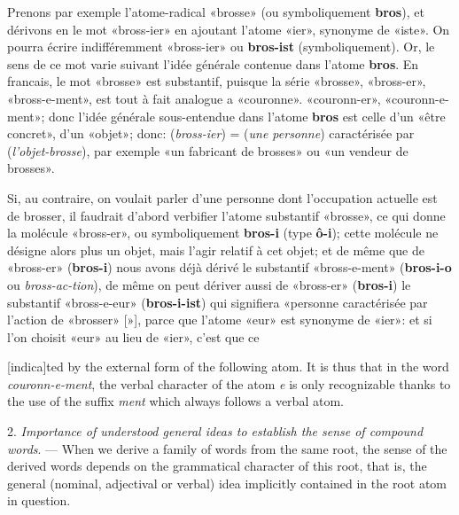 \begin{sloppypar}
{{    Prenons par exemple l’atome-radical «brosse» (ou symboliquement
    \textbf{bros}), et dérivons en le mot «bross-ier» en ajoutant
    l'atome «ier», synonyme de «iste». On pourra écrire indifféremment
    «bross-ier» ou \textbf{bros-ist} (symboliquement). Or, le sens de
    ce mot varie suivant l'idée générale contenue dans l’atome
    \textbf{bros}. En francais, le mot «brosse» est substantif,
    puisque la série «brosse», «bross-er», «bross-e-ment», est tout à
    fait analogue a «couronne». «couronn-er», «couronn-e-ment»; donc
    l'idée générale sous-entendue dans l'atome \textbf{bros} est celle
    d’un «être concret», d’un «objet»; donc: (\emph{bross-ier}) =
    (\emph{une personne}) caractérisée par (\emph{l'objet-brosse}),
    par exemple «un fabricant de brosses» ou «un vendeur de brosses».

    Si, au contraire, on voulait parler d’une personne dont
    l'occupation actuelle est de brosser, il faudrait d’abord
    verbifier l'atome substantif «brosse», ce qui donne la molécule
    «bross-er», ou symboliquement \textbf{bros-i} (type \textbf{ô-i});
    cette molécule ne désigne alors plus un objet, mais l’agir relatif
    à cet objet; et de même que de «bross-er» (\textbf{bros-i}) nous
    avons déjà dérivé le substantif «bross-e-ment» (\textbf{bros-i-o}
    ou \emph{bross-ac-tion}), de même on peut dériver aussi de
    «bross-er» (\textbf{bros-i}) le substantif «bross-e-eur»
    (\textbf{bros-i-ist}) qui signifiera «personne caractérisée par
    l'action de «brosser» [»], parce que l'atome «eur» est synonyme de
    «ier»: et si l’on choisit «eur» au lieu de «ier», c’est que ce}

}
%
{\noindent
  {\small
    [indica]ted by the external form of the following atom. It is thus
    that in the word \emph{couronn-e-ment}, the verbal character of the
    atom \emph{e} is only recognizable thanks to the use of the suffix
    \emph{ment} which always follows a verbal atom.

    2. \emph{Importance of understood general ideas to establish the
      sense of compound words}. --- When we derive a family of words
    from the same root, the sense of the derived words depends on the
    grammatical character of this root, that is, the general (nominal,
    adjectival or verbal) idea implicitly contained in the root atom
    in question.

}}
\end{sloppypar}
